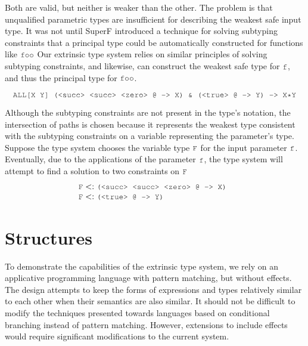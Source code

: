 \documentclass[acmsmall]{acmart}
\theoremstyle{definition}
\begin{document}
\noindent
Both are valid, but neither is weaker than the other. The problem is that unqualified parametric
types are insufficient for describing the weakest safe input type.
It was not until SuperF introduced a technique for solving subtyping constraints
that a principal type could be automatically constructed for functions like $\J{foo}$
Our extrinsic type system relies on similar principles of solving subtyping constraints,
and likewise, can construct the weakest safe type for $\J{f}$, and thus the principal type for $\J{foo}$.

\[
  \J{ALL[X Y] (<succ> <succ> <zero> @ -> X) \& (<true> @ -> Y) -> X*Y}
\]

Although the subtyping constraints are not present in the type's notation,
the intersection of paths is chosen because it represents the weakest type
consistent with the subtyping constraints on a variable representing the parameter's type. 
Suppose the type system chooses the variable type $\J{F}$ for the input parameter $\J{f}$.
Eventually, due to the applications of the parameter $\J{f}$, the type
system will attempt to find a solution to two constraints on $\J{F}$
\[
  \begin{array}[t]{@{} l}
    \J{F} \subtypes \J{(<succ> <succ> <zero> @ -> X)}
    \\
    \J{F} \subtypes \J{(<true> @ -> Y)}
  \end{array}
\]


\section{Structures}
\label{sec:structures}
To demonstrate the capabilities of the extrinsic type system, we rely on an applicative
programming language with pattern matching, but without effects.
The design attempts to keep the forms of expressions and types relatively 
similar to each other when their semantics are also similar. 
It should not be difficult to modify the techniques presented towards
languages based on conditional branching instead of pattern matching. However,
extensions to include effects would require 
significant modifications to the current system.
\end{document}
